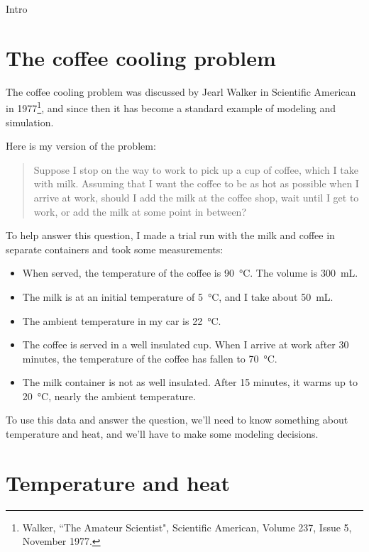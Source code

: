 \documentclass[12pt]{book}
\theoremstyle{exercise}
\begin{document}
Intro

\section{The coffee cooling problem}

The coffee cooling problem was discussed by Jearl Walker in Scientific American in 1977\footnote{Walker, ``The Amateur Scientist", Scientific American, Volume 237, Issue 5, November 1977.}, and since then it has become a standard example of modeling and simulation.

Here is my version of the problem:

\begin{quote}
Suppose I stop on the way to work to pick up a cup of coffee, which I take with milk.  Assuming that I want the coffee to be as hot as possible when I arrive at work, should I add the milk at the coffee shop, wait until I get to work, or add the milk at some point in between?
\end{quote}

To help answer this question, I made a trial run with the milk and coffee in separate containers and took some measurements:

\begin{itemize}

\item When served, the temperature of the coffee is \SI{90}{\celsius}.  The volume is \SI{300}{mL}.

\item The milk is at an initial temperature of \SI{5}{\celsius}, and I take about \SI{50}{mL}.

\item The ambient temperature in my car is \SI{22}{\celsius}.

\item The coffee is served in a well insulated cup.  When I arrive at work after 30 minutes, the temperature of the coffee has fallen to \SI{70}{\celsius}.

\item The milk container is not as well insulated.  After 15 minutes, it warms up to \SI{20}{\celsius}, nearly the ambient temperature.

\end{itemize}

To use this data and answer the question, we'll need to know something about temperature and heat, and we'll have to make some modeling decisions.


\section{Temperature and heat}
\end{document}
